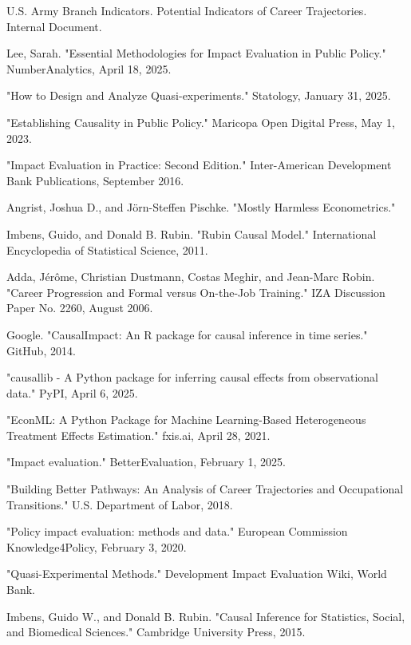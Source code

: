 \documentclass[main.tex]{subfiles}
\begin{document}
\begin{thebibliography}{21}
 U.S. Army Branch Indicators. Potential Indicators of Career Trajectories. Internal Document.

 Lee, Sarah. "Essential Methodologies for Impact Evaluation in Public Policy." NumberAnalytics, April 18, 2025.

 "How to Design and Analyze Quasi-experiments." Statology, January 31, 2025.

 "Establishing Causality in Public Policy." Maricopa Open Digital Press, May 1, 2023.

 "Impact Evaluation in Practice: Second Edition." Inter-American Development Bank Publications, September 2016.

 Angrist, Joshua D., and Jörn-Steffen Pischke. "Mostly Harmless Econometrics." 

 Imbens, Guido, and Donald B. Rubin. "Rubin Causal Model." International Encyclopedia of Statistical Science, 2011.

 Adda, Jérôme, Christian Dustmann, Costas Meghir, and Jean-Marc Robin. "Career Progression and Formal versus On-the-Job Training." IZA Discussion Paper No. 2260, August 2006.

 Google. "CausalImpact: An R package for causal inference in time series." GitHub, 2014.

 "causallib - A Python package for inferring causal effects from observational data." PyPI, April 6, 2025.

 "EconML: A Python Package for Machine Learning-Based Heterogeneous Treatment Effects Estimation." fxis.ai, April 28, 2021.

 "Impact evaluation." BetterEvaluation, February 1, 2025.

 "Building Better Pathways: An Analysis of Career Trajectories and Occupational Transitions." U.S. Department of Labor, 2018.

 "Policy impact evaluation: methods and data." European Commission Knowledge4Policy, February 3, 2020.

 "Quasi-Experimental Methods." Development Impact Evaluation Wiki, World Bank.

 Imbens, Guido W., and Donald B. Rubin. "Causal Inference for Statistics, Social, and Biomedical Sciences." Cambridge University Press, 2015.


\end{thebibliography}
\end{document}
